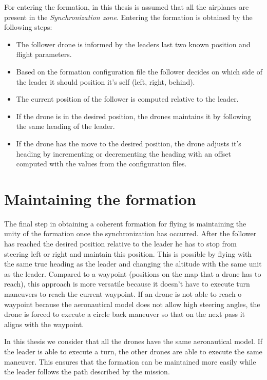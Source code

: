 \newpage

For entering the formation, in this thesis is assumed that all the airplanes are
present in the \textit {Synchronization zone}. Entering the formation is obtained
by the following steps:

\begin {itemize}
\item The follower drone is informed by the leaders last two known position and flight
parameters.
\item Based on the formation configuration file the follower decides on which side
of the leader it should position it's self (left, right, behind).
\item The current position of the follower is computed relative to the leader.
\item If the drone is in the desired position, the drones maintains it 
by following the same heading of the leader.
\item If the drone has the move to the desired position, the drone adjusts it's
heading by incrementing or decrementing the heading with an offset computed
with the values from the configuration files.
\end {itemize}

\section{Maintaining the formation}
\label{sec:formation-maintainig}
The final step in obtaining a coherent formation for flying is maintaining
the unity of the formation once the synchronization has occurred. After
the follower has reached the desired position relative to the leader
he has to stop from steering left or right and maintain this position. This
is possible by flying with the same true heading as the leader and changing the
altitude with the same unit as the leader. Compared to a waypoint (positions on
the map that a drone has to reach), this approach is more versatile
because it doesn't have to execute turn maneuvers to reach the current waypoint.
If an drone is not able to reach o waypoint because the aeronautical model
does not allow high steering angles, the drone is forced to execute a 
circle back maneuver so that on the next pass it aligns with the waypoint. 

In this thesis we consider that all the drones have the same aeronautical model.
If the leader is able to execute a turn, the other drones are able to execute
the same maneuver. This ensures that the formation can be maintained
more easily while the leader follows the path described by the mission. 

